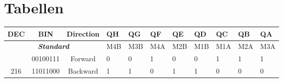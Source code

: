\section{Tabellen}

\begin{table}[h]
\centering
\begin{tabular}{cccllllllll}
\rowcolor[HTML]{4472C4} 
{\color[HTML]{FFFFFF} \textbf{DEC}} & {\color[HTML]{FFFFFF} \textbf{BIN}} & {\color[HTML]{FFFFFF} \textbf{Direction}} & {\color[HTML]{FFFFFF} \textbf{QH}} & {\color[HTML]{FFFFFF} \textbf{QG}} & {\color[HTML]{FFFFFF} \textbf{QF}} & {\color[HTML]{FFFFFF} \textbf{QE}} & {\color[HTML]{FFFFFF} \textbf{QD}} & {\color[HTML]{FFFFFF} \textbf{QC}} & {\color[HTML]{FFFFFF} \textbf{QB}} & {\color[HTML]{FFFFFF} \textbf{QA}} \\ \hline
\multicolumn{3}{|c|}{\textit{\textbf{Standard}}} & \multicolumn{1}{l|}{\cellcolor[HTML]{FFFFFF}M4B} & \multicolumn{1}{l|}{\cellcolor[HTML]{FFFFFF}M3B} & \multicolumn{1}{l|}{\cellcolor[HTML]{FFFFFF}M4A} & \multicolumn{1}{l|}{\cellcolor[HTML]{FFFFFF}M2B} & \multicolumn{1}{l|}{\cellcolor[HTML]{FFFFFF}M1B} & \multicolumn{1}{l|}{\cellcolor[HTML]{FFFFFF}M1A} & \multicolumn{1}{l|}{\cellcolor[HTML]{FFFFFF}M2A} & \multicolumn{1}{l|}{\cellcolor[HTML]{FFFFFF}M3A} \\ \hline
\rowcolor[HTML]{D9E1F2} 
\multicolumn{1}{|c|}{\cellcolor[HTML]{D9E1F2}39} & \multicolumn{1}{c|}{\cellcolor[HTML]{D9E1F2}00100111} & \multicolumn{1}{c|}{\cellcolor[HTML]{D9E1F2}Forward} & \multicolumn{1}{l|}{\cellcolor[HTML]{D9E1F2}0} & \multicolumn{1}{l|}{\cellcolor[HTML]{D9E1F2}0} & \multicolumn{1}{l|}{\cellcolor[HTML]{D9E1F2}1} & \multicolumn{1}{l|}{\cellcolor[HTML]{D9E1F2}0} & \multicolumn{1}{l|}{\cellcolor[HTML]{D9E1F2}0} & \multicolumn{1}{l|}{\cellcolor[HTML]{D9E1F2}1} & \multicolumn{1}{l|}{\cellcolor[HTML]{D9E1F2}1} & \multicolumn{1}{l|}{\cellcolor[HTML]{D9E1F2}1} \\ \hline
\multicolumn{1}{|c|}{216} & \multicolumn{1}{c|}{11011000} & \multicolumn{1}{c|}{Backward} & \multicolumn{1}{l|}{\cellcolor[HTML]{FFFFFF}1} & \multicolumn{1}{l|}{\cellcolor[HTML]{FFFFFF}1} & \multicolumn{1}{l|}{\cellcolor[HTML]{FFFFFF}0} & \multicolumn{1}{l|}{\cellcolor[HTML]{FFFFFF}1} & \multicolumn{1}{l|}{\cellcolor[HTML]{FFFFFF}1} & \multicolumn{1}{l|}{\cellcolor[HTML]{FFFFFF}0} & \multicolumn{1}{l|}{\cellcolor[HTML]{FFFFFF}0} & \multicolumn{1}{l|}{\cellcolor[HTML]{FFFFFF}0} \\ \hline

\end{tabular}
\end{table}
